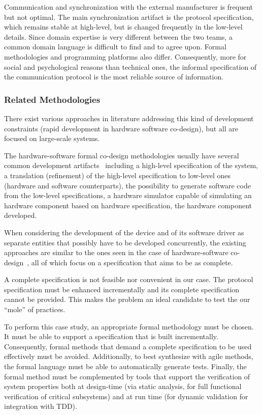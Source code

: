 \documentclass[english]{lni}
\begin{document}
Communication and synchronization with the external manufacturer is
frequent but not optimal.  The main synchronization artifact is the
protocol specification, which remains stable at high-level, but is
changed frequently in the low-level details.  Since domain expertise
is very different between the two teams, a common domain language is
difficult to find and to agree upon.  Formal methodologies and
programming platforms also differ.  Consequently, more for social and
psychological reasons than technical ones, the informal specification
of the communication protocol is the most reliable source of
information.

\subsubsection{Related Methodologies}
\label{sec:relat-meth}

There exist various approaches in literature addressing this kind of
development constraints (rapid development in hardware software
co-design), but all are focused on large-scale systems.  

The hardware-software formal co-design methodologies usually have
several common development artifacts~\cite{Slomka2000, Hoffman2001}
including a high-level specification of the system, a translation
(refinement) of the high-level specification to low-level ones
(hardware and software counterparts), the possibility to generate
software code from the low-level specifications, a hardware simulator
capable of simulating an hardware component based on hardware
specification, the hardware component developed.

When considering the development of the device and of its software
driver as separate entities that possibly have to be developed
concurrently, the existing approaches are similar to the ones seen in
the case of hardware-software co-design~\cite{Valderrama1995,
  Siegmund2002, Ryzhyk2009}, all of which focus on a specification
that aims to be as complete.

A complete specification is not feasible nor convenient in our case.
The protocol specification must be enhanced incrementally and its
complete specification cannot be provided.  This makes the problem an
ideal candidate to test the our ``mole'' of practices.

To perform this case study, an appropriate formal methodology must be
chosen.  It must be able to support a specification that is built
incrementally.  Consequently, formal methods that demand a complete
specification to be used effectively must be avoided.  Additionally,
to best synthesize with agile methods, the formal language must be
able to automatically generate tests.  Finally, the formal method must
be complemented by tools that support the verification of system
properties both at design-time (via static analysis, for full
functional verification of critical subsystems) and at run time (for
dynamic validation for integration with TDD).
\end{document}

